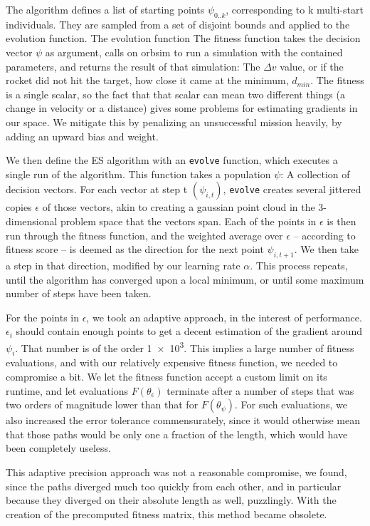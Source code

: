 The algorithm defines a list of starting points $\psi_{0..k}$, corresponding to k multi-start individuals. They are sampled from a set of disjoint bounds and applied to the evolution function. The evolution function  The fitness function takes the decision vector \(\psi\) as argument, calls on orbsim to run a simulation with the contained parameters, and returns the result of that simulation: The \(\Delta v\) value, or if the rocket did not hit the target, how close it came at the minimum, \(d_{min}\). The fitness is a single scalar, so the fact that that scalar can mean two different things (a change in velocity or a distance) gives some problems for estimating gradients in our space. We mitigate this by penalizing an unsuccessful mission heavily, by adding an upward bias and weight.

We then define the ES algorithm with an \texttt{evolve} function, which executes a single run of the algorithm. This function takes a population \(\psi\): A collection of decision vectors. For each vector at step t \((\psi_{i,t})\), \texttt{evolve} creates several jittered copies \(\epsilon\) of those vectors, akin to creating a gaussian point cloud in the 3-dimensional problem space that the vectors span. Each of the points in \(\epsilon\) is then run through the fitness function, and the weighted average over \(\epsilon\) -- according to fitness score -- is deemed as the direction for the next point \(\psi_{i,t+1}\). We then take a step in that direction, modified by our learning rate \(\alpha\). This process repeats, until the algorithm has converged upon a local minimum, or until some maximum number of steps have been taken.

For the points in \(\epsilon\), we took an adaptive approach, in the interest of performance. \(\epsilon_i\) should contain enough points to get a decent estimation of the gradient around \(\psi_i\). That number is of the order \num{1e3}. This implies a large number of fitness evaluations, and with our relatively expensive fitness function, we needed to compromise a bit. We let the fitness function accept a custom limit on its runtime, and let evaluations \(F(\theta_\epsilon)\) terminate after a number of steps that was two orders of magnitude lower than that for \(F(\theta_\psi)\). For such evaluations, we also increased the error tolerance commensurately, since it would otherwise mean that those paths would be only one a fraction of  the length, which would have been completely useless.

This adaptive precision approach was not a reasonable compromise, we found, since the paths diverged much too quickly from each other, and in particular because they diverged on their absolute length as well, puzzlingly. With the creation of the precomputed fitness matrix, this method became obsolete.

